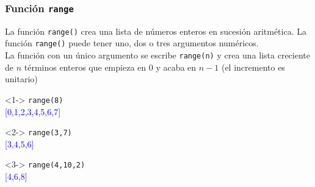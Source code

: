 \begin{frame}[fragile]
\frametitle{Funci\'{o}n \texttt{range}}
La funci\'{o}n \texttt{range()} crea una lista de n\'{u}meros enteros en sucesi\'{o}n aritm\'{e}tica. La funci\'{o}n \texttt{range()} puede tener uno, dos o tres argumentos num\'{e}ricos.
\\
\bigskip
La funci\'{o}n con un \'{u}nico argumento se escribe \texttt{range(n)} y crea una lista creciente de $n$ t\'{e}rminos enteros que empieza en $0$ y acaba en $n-1$ (el incremento es unitario)
\fontsize{12}{12}\selectfont
\begin{center}
\begin{minipage}{6cm}
\begin{exampleblock}{}<1->
	\verb|range(8)| \\
	\pause
	\textcolor{blue}{[0,1,2,3,4,5,6,7]}
\end{exampleblock}
\begin{exampleblock}{}<2->
	\verb|range(3,7)| \\
	\pause
	\textcolor{blue}{[3,4,5,6]}
\end{exampleblock}
\begin{exampleblock}{}<3->
	\verb|range(4,10,2)| \\
	\pause
	\textcolor{blue}{[4,6,8]}
\end{exampleblock}
\end{minipage}
\end{center}
\end{frame}

